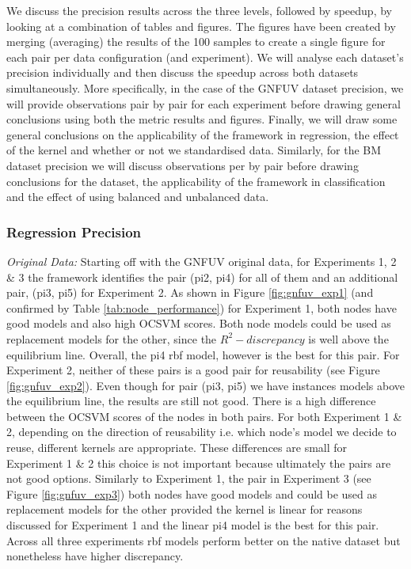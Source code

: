 \documentclass{mpaper}
\begin{document}
We discuss the precision results across the three levels, followed by speedup, by looking at a combination of tables and figures. The figures have been created by merging (averaging) the results of the 100 samples to create a single figure for each pair per data configuration (and experiment). We will analyse each dataset's precision individually and then discuss the speedup across both datasets simultaneously. More specifically, in the case of the GNFUV dataset precision, we will provide observations pair by pair for each experiment before drawing general conclusions using both the metric results and figures. Finally, we will draw some general conclusions on the applicability of the framework in regression, the effect of the kernel and whether or not we standardised data. Similarly, for the BM dataset precision we will discuss observations per by pair before drawing conclusions for the dataset, the applicability of the framework in classification and the effect of using balanced and unbalanced data.

\subsubsection{Regression Precision}

\textit{Original Data:} {} Starting off with the GNFUV original data, for Experiments 1, 2 \& 3 the framework identifies the pair (pi2, pi4) for all of them and an additional pair, (pi3, pi5) for Experiment 2. As shown in Figure \ref{fig:gnfuv_exp1} (and confirmed by Table \ref{tab:node_performance}) for Experiment 1, both nodes have good models and also high OCSVM scores. Both node models could be used as replacement models for the other, since the $R^2 - discrepancy$ is well above the equilibrium line. Overall, the pi4 rbf model, however is the best for this pair. For Experiment 2, neither of these pairs is a good pair for reusability (see Figure \ref{fig:gnfuv_exp2}). Even though for pair (pi3, pi5) we have instances models above the equilibrium line, the results are still not good.  There is a high difference between the OCSVM scores of the nodes in both pairs. For both Experiment 1 \& 2, depending on the direction of reusability i.e. which node's model we decide to reuse, different kernels are appropriate. These differences are small for Experiment 1 \& 2 this choice is not important because ultimately the pairs are not good options. Similarly to Experiment 1, the pair in Experiment 3 (see Figure \ref{fig:gnfuv_exp3}) both nodes have good models and could be used as replacement models for the other provided the kernel is linear for reasons discussed for Experiment 1 and the linear pi4 model is the best for this pair. Across all three experiments rbf models perform better on the native dataset but nonetheless have higher discrepancy.
\end{document}
